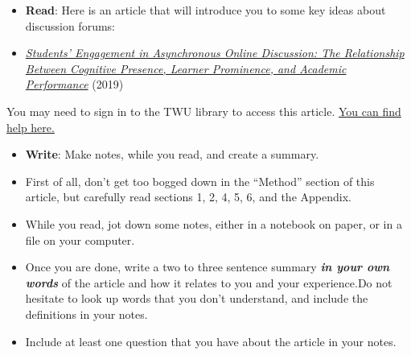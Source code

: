 \documentclass[
  letterpaper,
  DIV=11,
  numbers=noendperiod]{scrreprt}
\providecommand{\tightlist}{%
  \setlength{\itemsep}{0pt}\setlength{\parskip}{0pt}}\usepackage{longtable,booktabs,array}
\begin{document}
\begin{tcolorbox}[enhanced jigsaw, toprule=.15mm, colback=white, colframe=quarto-callout-note-color-frame, bottomtitle=1mm, leftrule=.75mm, coltitle=black, titlerule=0mm, rightrule=.15mm, colbacktitle=quarto-callout-note-color!10!white, left=2mm, title={Learning Activity}, opacitybacktitle=0.6, opacityback=0, breakable, toptitle=1mm, arc=.35mm, bottomrule=.15mm]

\begin{itemize}
\tightlist
\item
  \textbf{Read}: Here is an article that will introduce you to some key
  ideas about discussion forums:
\item
  \href{https://eds-p-ebscohost-com.twu.idm.oclc.org/eds/detail/detail?vid=0&sid=b4111a26-0a0d-40e8-b042-dde9b384c6f6\%40redis&bdata=JnNpdGU9ZWRzLWxpdmUmc2NvcGU9c2l0ZQ\%3d\%3d\#AN=S1096751619304105&db=edselp}{\emph{Students'
  Engagement in Asynchronous Online Discussion: The Relationship Between
  Cognitive Presence, Learner Prominence, and Academic Performance}}
  (2019)
\end{itemize}

\begin{tcolorbox}[enhanced jigsaw, toprule=.15mm, colback=white, colframe=quarto-callout-note-color-frame, arc=.35mm, opacityback=0, breakable, rightrule=.15mm, bottomrule=.15mm, leftrule=.75mm, left=2mm]

You may need to sign in to the TWU library to access this article.
\href{https://libguides.twu.ca/help}{You can find help here.}

\end{tcolorbox}

\begin{itemize}
\tightlist
\item
  \textbf{Write}: Make notes, while you read, and create a summary.
\item
  First of all, don't get too bogged down in the ``Method'' section of
  this article, but carefully read sections 1, 2, 4, 5, 6, and the
  Appendix.
\item
  While you read, jot down some notes, either in a notebook on paper, or
  in a file on your computer.
\item
  Once you are done, write a two to three sentence summary
  \textbf{\emph{in your own words}} of the article and how it relates to
  you and your experience.Do not hesitate to look up words that you
  don't understand, and include the definitions in your notes.
\item
  Include at least one question that you have about the article in your
  notes.
\end{itemize}

\end{tcolorbox}
\end{document}
